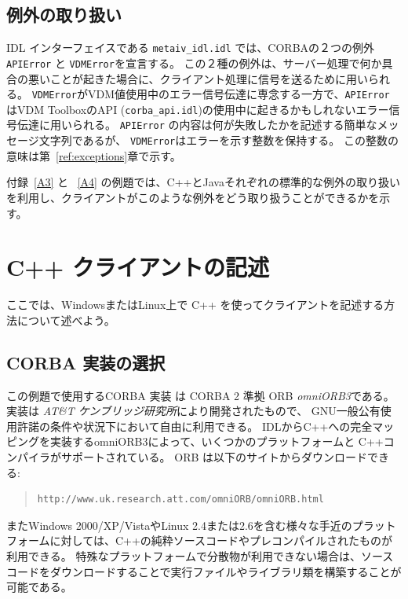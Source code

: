 \documentclass[\pformat,12pt]{jarticle}
\begin{document}
\subsection{例外の取り扱い}
\label{handlingofexceptions}

IDL インターフェイスである {\tt metaiv\_idl.idl} では、CORBAの２つの例外{\tt APIError} と {\tt VDMError}を宣言する。
この２種の例外は、サーバー処理で何か具合の悪いことが起きた場合に、クライアント処理に信号を送るために用いられる。
 {\tt VDMError}がVDM値使用中のエラー信号伝達に専念する一方で、{\tt APIError} はVDM ToolboxのAPI ({\tt  corba\_api.idl})の使用中に起きるかもしれないエラー信号伝達に用いられる。
 {\tt APIError} の内容は何が失敗したかを記述する簡単なメッセージ文字列であるが、 {\tt VDMError}はエラーを示す整数を保持する。
この整数の意味は第~\ref{ref:exceptions}章で示す。

付録~\ref{A3} と ~\ref{A4} の例題では、C++とJavaそれぞれの標準的な例外の取り扱いを利用し、クライアントがこのような例外をどう取り扱うことができるかを示す。

\newpage
\section{ C++ クライアントの記述}
\label{writingacppclient}

ここでは、WindowsまたはLinux上で C++ を使ってクライアントを記述する方法について述べよう。

\subsection{CORBA 実装の選択}

この例題で使用するCORBA 実装 は CORBA 2 準拠 ORB {\em omniORB3}である。
実装は {\em AT\&T ケンブリッジ研究所}により開発されたもので、 GNU一般公有使用許諾の条件や状況下において自由に利用できる。
IDLからC++への完全マッピングを実装するomniORB3によって、いくつかのプラットフォームと C++コンパイラがサポートされている。  
ORB は以下のサイトからダウンロードできる:

\begin{quote}
\begin{verbatim}    
http://www.uk.research.att.com/omniORB/omniORB.html
\end{verbatim}
\end{quote}

またWindows 2000/XP/VistaやLinux 2.4または2.6を含む様々な手近のプラットフォームに対しては、C++の純粋ソースコードやプレコンパイルされたものが利用できる。
特殊なプラットフォームで分散物が利用できない場合は、ソースコードをダウンロードすることで実行ファイルやライブラリ類を構築することが可能である。
\end{document}
